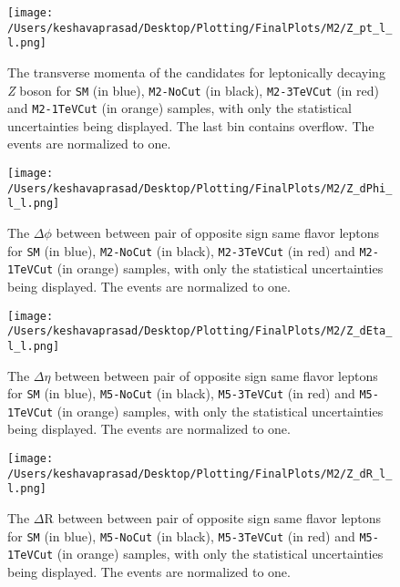 \begin{figure}[!htb]
	\centering
	\texttt{[image: /Users/keshavaprasad/Desktop/Plotting/FinalPlots/M2/Z\_pt\_l\_l.png]}
	\caption{The transverse momenta of the candidates for leptonically decaying \textit{Z} boson for \texttt{SM} (in blue), \texttt{M2-NoCut} (in black), \texttt{M2-3TeVCut} (in red) and \texttt{M2-1TeVCut} (in orange) samples, with only the statistical uncertainties being displayed. The last bin contains overflow. The events are normalized to one.}
	\label{M2-ZlepleppT}
\end{figure}

\begin{figure}[!h]%
	\centering
	\texttt{[image: /Users/keshavaprasad/Desktop/Plotting/FinalPlots/M2/Z\_dPhi\_l\_l.png]}
	\caption{The $\Delta\phi$ between between pair of opposite sign same flavor leptons for \texttt{SM} (in blue), \texttt{M2-NoCut} (in black), \texttt{M2-3TeVCut} (in red) and \texttt{M2-1TeVCut} (in orange) samples, with only the statistical uncertainties being displayed. The events are normalized to one.}
	\label{M2-ZleplepdPhi-PostCuts}
\end{figure}

\begin{figure}[!h]%
	\centering
	\texttt{[image: /Users/keshavaprasad/Desktop/Plotting/FinalPlots/M2/Z\_dEta\_l\_l.png]}
	\caption{The $\Delta\eta$ between between pair of opposite sign same flavor leptons for \texttt{SM} (in blue), \texttt{M5-NoCut} (in black), \texttt{M5-3TeVCut} (in red) and \texttt{M5-1TeVCut} (in orange) samples, with only the statistical uncertainties being displayed. The events are normalized to one.}
	\label{M2-ZleplepdEta-PostCuts}
\end{figure}

\begin{figure}[!h]%
	\centering
	\texttt{[image: /Users/keshavaprasad/Desktop/Plotting/FinalPlots/M2/Z\_dR\_l\_l.png]}
	\caption{The $\Delta \text{R}$ between between pair of opposite sign same flavor leptons for \texttt{SM} (in blue), \texttt{M5-NoCut} (in black), \texttt{M5-3TeVCut} (in red) and \texttt{M5-1TeVCut} (in orange) samples, with only the statistical uncertainties being displayed. The events are normalized to one.}
	\label{M2-Z-dR-PostCuts}
\end{figure}

